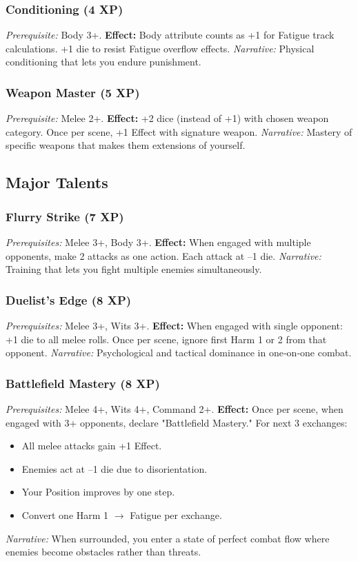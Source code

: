 \subsubsection{Conditioning (4 XP)}\label{talent:conditioning}
\textit{Prerequisite:} Body 3+.
\textbf{Effect:} Body attribute counts as +1 for Fatigue track calculations. +1 die to resist Fatigue overflow effects.
\textit{Narrative:} Physical conditioning that lets you endure punishment.

\subsubsection{Weapon Master (5 XP)}\label{talent:weapon_master}
\textit{Prerequisite:} Melee 2+.
\textbf{Effect:} +2 dice (instead of +1) with chosen weapon category. Once per scene, +1 Effect with signature weapon.
\textit{Narrative:} Mastery of specific weapons that makes them extensions of yourself.

\subsection{Major Talents}

\subsubsection{Flurry Strike (7 XP)}\label{talent:flurry_strike}
\textit{Prerequisites:} Melee 3+, Body 3+.
\textbf{Effect:} When engaged with multiple opponents, make 2 attacks as one action. Each attack at --1 die.
\textit{Narrative:} Training that lets you fight multiple enemies simultaneously.

\subsubsection{Duelist's Edge (8 XP)}\label{talent:duelist_edge}
\textit{Prerequisites:} Melee 3+, Wits 3+.
\textbf{Effect:} When engaged with single opponent: +1 die to all melee rolls. Once per scene, ignore first Harm 1 or 2 from that opponent.
\textit{Narrative:} Psychological and tactical dominance in one‑on‑one combat.

\subsubsection{Battlefield Mastery (8 XP)}\label{talent:battlefield_mastery}
\textit{Prerequisites:} Melee 4+, Wits 4+, Command 2+.
\textbf{Effect:} Once per scene, when engaged with 3+ opponents, declare "Battlefield Mastery." For next 3 exchanges:
\begin{itemize}[nosep]
    \item All melee attacks gain +1 Effect.
    \item Enemies act at --1 die due to disorientation.
    \item Your Position improves by one step.
    \item Convert one Harm 1 $\rightarrow$ Fatigue per exchange.
\end{itemize}
\textit{Narrative:} When surrounded, you enter a state of perfect combat flow where enemies become obstacles rather than threats.

